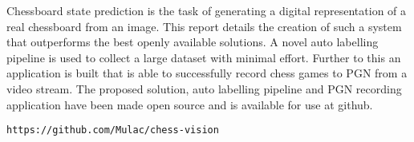 Chessboard state prediction is the task of generating a digital representation of a real chessboard from an image.
This report details the creation of such a system that outperforms the best openly available solutions.
A novel auto labelling pipeline is used to collect a large dataset with minimal effort.  Further to this an application 
is built that is able to successfully record chess games to PGN from a video stream.  
The proposed solution, auto labelling pipeline and PGN recording application have been made open source and is available for use at 
github.

\begin{center}
    \centering
    \verb|https://github.com/Mulac/chess-vision|
\end{center}

